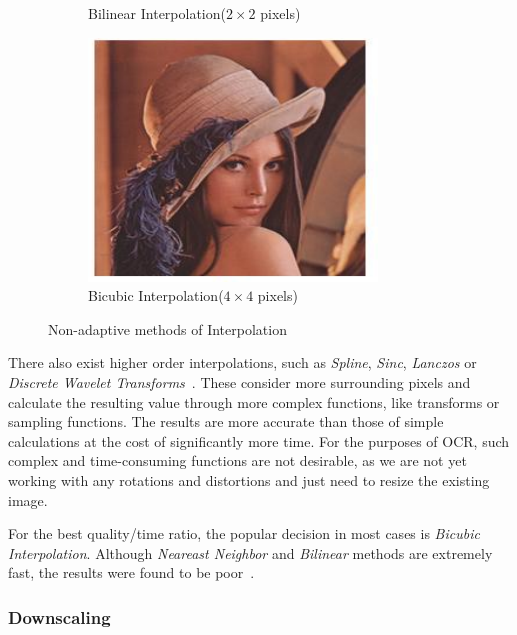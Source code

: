 \begin{figure}[H]
\begin{subfigure}{0.31\textwidth}
\caption{Bilinear Interpolation($2\times2$ pixels)} \label{fig:1b}
\end{subfigure}
\hspace*{\fill} %
\begin{subfigure}{0.31\textwidth}
\includegraphics[width=\linewidth]{img/interp_bicubic.pdf}
\caption{Bicubic Interpolation($4\times4$ pixels)} \label{fig:1c}
\end{subfigure}
\caption{Non-adaptive methods of Interpolation} \label{fig:1}
\end{figure}

There also exist higher order interpolations, such as \emph{Spline}, \emph{Sinc}, \emph{Lanczos} or \emph{Discrete Wavelet Transforms}~\cite{interpolation}. These consider more surrounding pixels and calculate the resulting value through more complex functions, like transforms or sampling functions. The results are more accurate than those of simple calculations at the cost of significantly more time. For the purposes of OCR, such complex and time-consuming functions are not desirable, as we are not yet working with any rotations and distortions and just need to resize the existing image.

For the best quality/time ratio, the popular decision in most cases is \emph{Bicubic Interpolation}. Although \emph{Neareast Neighbor} and \emph{Bilinear} methods are extremely fast, the results were found to be poor~\cite{interpolationComp}.

\subsubsection{Downscaling}

